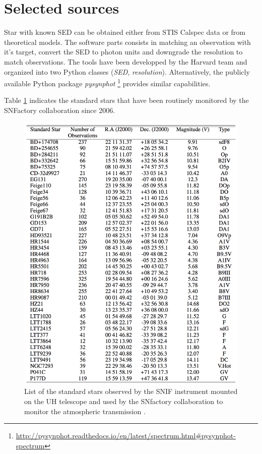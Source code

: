 \documentclass[DM,authoryear,toc,lsstdraft]{lsstdoc}
\begin{document}
\section{Selected sources}


Star with known SED can be obtained either from STIS Calspec data or from theoretical models.
The software parts consists in matching an observation with it's target, convert the SED to photon units and downgrade the resolution to match observations. The tools have been developped by the Harvard team and organized into two Python classes ({\it SED}, {\it resolution}). Alternatively, the publicly available Python package {\it pysynphot} \footnote{\url{http://pysynphot.readthedocs.io/en/latest/spectrum.html\#pysynphot-spectrum}} provides similar capabilities.


Table \ref{fig:im2} indicates the standard stars that have been routinely monitored by the SNFactory collaboration since 2006.

\begin{figure}
\centering
\includegraphics[width=0.6\linewidth]{figures/snf_target.png}
\caption{ List of the standard stars observed by the SNIF instrument mounted on the UH telescope and used by the SNfactory collaboration to monitor the atmospheric transmission \citep{2013A&A...549A...8B}.
\label{fig:im2}
}
\end{figure}


\end{document}
